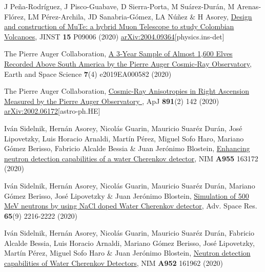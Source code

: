 \begin{etaremune}
\item {} J Peña-Rodríguez, J Pisco-Guabave, D Sierra-Porta, M Suárez-Durán, M Arenas-Flórez, LM Pérez-Archila, JD Sanabria-Gómez, LA Núñez \& H Asorey, \href{https://doi.org/10.1088/1748-0221/15/09/P09006}{{Design and construction of MuTe: a hybrid Muon Telescope to study Colombian Volcanoes}}, JINST {\bf{15}} P09006 (2020) \href{https://arxiv.org/abs/2004.09364}{arXiv:2004.09364}[physics.ins-det]

\item {}The Pierre Auger Collaboration, \href{https://doi.org/10.1029/2019EA000582}{A 3‐Year Sample of Almost 1,600 Elves Recorded Above South America by the Pierre Auger Cosmic‐Ray Observatory}, Earth and Space Science {\bf{7}}(4) e2019EA000582 (2020) %

\item {}The Pierre Auger Collaboration, \href{https://doi.org/10.3847/1538-4357/ab7236}{{Cosmic-Ray Anisotropies in Right Ascension Measured by the Pierre Auger Observatory
}}, ApJ {\bf{891}}(2) 142 (2020) \href{https://arxiv.org/abs/2002.06172}{arXiv:2002.06172}[astro-ph.HE]

\item {} Iván Sidelnik, Hernán Asorey, Nicolás Guarin, Mauricio Suaréz Durán, José Lipovetzky, Luis Horacio Arnaldi, Martín Pérez, Miguel Sofo Haro, Mariano Gómez Berisso, Fabricio Alcalde Bessia \& Juan Jerónimo Blostein, \href{https://doi.org/10.1016/j.nima.2019.163172}{{Enhancing neutron detection capabilities of a water Cherenkov detector}}, NIM {\bf{A955}} 163172 (2020) %
	
\item {} Iván Sidelnik, Hernán Asorey, Nicolás Guarin, Mauricio Suaréz Durán, Mariano Gómez Berisso, José Lipovetzky \& Juan Jerónimo Blostein, \href{https://doi.org/10.1016/j.asr.2020.02.024}{{Simulation of 500 MeV neutrons by using NaCl doped Water Cherenkov detector}}, Adv. Space Res. {\bf{65}}(9) 2216-2222 (2020) %

\item {} Iván Sidelnik, Hernán Asorey, Nicolás Guarin, Mauricio Suaréz Durán, Fabricio Alcalde Bessia, Luis Horacio Arnaldi, Mariano Gómez Berisso, José Lipovetzky, Martín Pérez, Miguel Sofo Haro \& Juan Jerónimo Blostein, \href{https://doi.org/10.1016/j.nima.2019.03.017}{{Neutron detection capabilities of Water Cherenkov Detectors}}, NIM {\bf{A952}} 161962 (2020) %


\end{etaremune}
